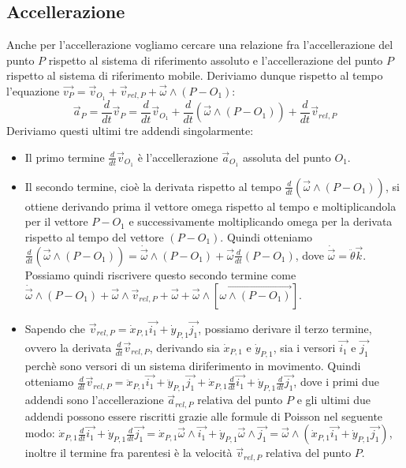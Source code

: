 \subsection{Accellerazione}
Anche per l'accellerazione vogliamo cercare una relazione fra l'accellerazione del punto $P$ rispetto al sistema di riferimento assoluto e l'accellerazione del punto $P$ rispetto al sistema di riferimento mobile.\newline
\newline
Deriviamo dunque rispetto al tempo l'equazione $\vec{v_P} = \vec{v}_{O_1} + \vec{v}_{rel, P} + \vec{\omega} \land (P-O_1)$:
\[
    \vec{a}_P = \frac{d}{dt} \vec{v}_P = \frac{d}{dt} \vec{v}_{O_1} + \frac{d}{dt}(\vec{\omega}\land (P-O_1)) + \frac{d}{dt}\vec{v}_{rel,P}
\]
Deriviamo questi ultimi tre addendi singolarmente:
\begin{itemize}
    \item Il primo termine $\frac{d}{dt} \vec{v}_{O_1}$ è l'accellerazione $\vec{a}_{O_1}$ assoluta del punto $O_1$.
    \item Il secondo termine, cioè la derivata rispetto al tempo $\frac{d}{dt}(\vec{\omega}\land (P-O_1))$, si ottiene derivando prima il vettore omega rispetto al tempo e moltiplicandola per il vettore $P-O_1$ e successivamente moltiplicando omega per la derivata rispetto al tempo del vettore $(P-O_1)$. Quindi otteniamo $\frac{d}{dt}(\vec{\omega}\land (P-O_1)) = \dot{\vec{\omega}} \land (P-O_1) + \vec{\omega} \frac{d}{dt}(P-O_1)$, dove $\dot{\vec{\omega}} = \ddot{\theta} \vec{k}$. Possiamo quindi riscrivere questo secondo termine come $\dot{\vec{\omega}} \land (P-O_1) + \vec{\omega}\land \vec{v}_{rel,P} + \vec{\omega} + \vec{\omega}\land[\vec{\omega \land (P-O_1)}]$.
    \item Sapendo che $\vec{v}_{rel,P} = \dot{x}_{P,1} \vec{i_1} + \dot{y}_{P,1} \vec{j_1}$, possiamo derivare il terzo termine, ovvero la derivata $\frac{d}{dt}\vec{v}_{rel,P}$, derivando sia $\dot{x}_{P,1}$ e $\dot{y}_{P,1}$, sia i versori $\vec{i_1}$ e $\vec{j_1}$ perchè sono versori di un sistema diriferimento in movimento. Quindi otteniamo $\frac{d}{dt}\vec{v}_{rel,P} = \ddot{x}_{P,1} \vec{i_1} + \ddot{y}_{P,1} \vec{j_1} + \dot{x}_{P,1} \frac{d}{dt} \vec{i_1} + \dot{y}_{P,1} \frac{d}{dt}\vec{j_1}$, dove i primi due addendi sono l'accellerazione $\vec{a}_{rel,P}$ relativa del punto $P$ e gli ultimi due addendi possono essere riscritti grazie alle formule di Poisson nel seguente modo: $\dot{x}_{P,1} \frac{d}{dt} \vec{i_1} + \dot{y}_{P,1} \frac{d}{dt}\vec{j_1} = \dot{x}_{P,1} \vec{\omega}\land \vec{i_1} + \dot{y}_{P,1} \vec{\omega}\land \vec{j_1} = \vec{\omega} \land (\dot{x}_{P,1} \vec{i_1} + \dot{y}_{P,1} \vec{j_1})$, inoltre il termine fra parentesi è la velocità $\vec{v}_{rel,P}$ relativa del punto $P$.
\end{itemize}

